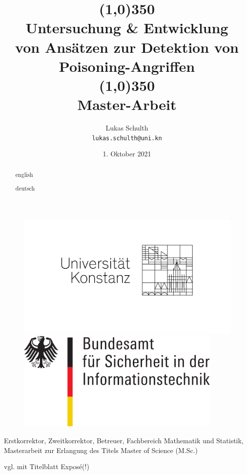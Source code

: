 \documentclass[twoside, 11pt,a4paper]{article}
\title{\line(1,0){350}\\Untersuchung \& Entwicklung \\von Ansätzen zur Detektion von Poisoning-Angriffen\\\line(1,0){350}\\
	Master-Arbeit}
\author{
	Lukas Schulth\\
	\texttt{lukas.schulth@uni.kn}
}
\date{1. Oktober 2021}
\numberwithin{equation}{section}
\begin{document}
	\begin{titlepage}
		
		
		
		\thispagestyle{empty} 
		\begin{figure}
			\centering
			\begin{minipage}{0.45\textwidth}
				\centering
				\includegraphics[width=1.2\textwidth]{logounikn} %
				
			\end{minipage}\hfill
			\begin{minipage}{0.45\textwidth}
				\centering
				\includegraphics[width=0.9\textwidth]{bsi_logo} %
				
			\end{minipage}
		\end{figure}
		\maketitle
		
		Erstkorrektor, Zweitkorrektor, Betreuer, Fachbereich Mathematik und Statistik, Masterarbeit zur Erlangung des Titels Master of Science (M.Sc.)
		
		vgl. mit Titelblatt Exposé(!)
		
	\end{titlepage}
	\begin{abstract}english\end{abstract}
	\begin{abstract}deutsch\end{abstract}
	
\end{document}
